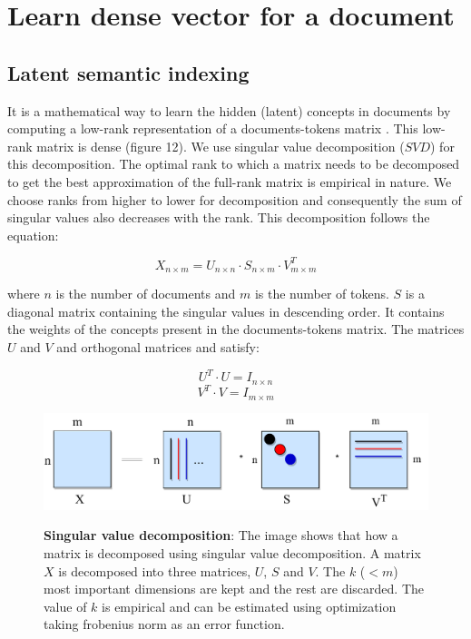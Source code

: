 \section{Learn dense vector for a document}
\subsection{Latent semantic indexing}
    It is a mathematical way to learn the hidden (latent) concepts in documents by computing a low-rank representation of a documents-tokens matrix \cite{Foltz1996, Shapiro2000, Landauer1998}. This low-rank matrix is dense (figure 12). We use singular value decomposition ($SVD$) for this decomposition. The optimal rank to which a matrix needs to be decomposed to get the best approximation of the full-rank matrix is empirical in nature. We choose ranks from higher to lower for decomposition and consequently the sum of singular values also decreases with the rank. This decomposition follows the equation:
    
    \begin{equation}
    X_{n \times m} = U_{n \times n} \cdot S_{n \times m} \cdot V_{m \times m}^T
    \end{equation}
    
    where $n$ is the number of documents and $m$ is the number of tokens. $S$ is a diagonal matrix containing the singular values in descending order. It contains the weights of the concepts present in the documents-tokens matrix. The matrices $U$ and $V$ and orthogonal matrices and satisfy:
    
    \begin{equation}
    U^T \cdot U = I_{n \times n}
    \end{equation}
    \begin{equation}
    V^T \cdot V = I_{m \times m}
    \end{equation}
    
\begin{figure}[h]
\begin{centering}
    {\includegraphics[scale=0.7]{figures/usv.pdf}}
    \caption[Pictorial representation of singular value decomposition]{\textbf{Singular value decomposition}: The image shows that how a matrix is decomposed using singular value decomposition. A matrix $X$ is decomposed into three matrices, $U$, $S$ and $V$. The $k$ ($<m$) most important dimensions are kept and the rest are discarded. The value of $k$ is empirical and can be estimated using optimization taking frobenius norm as an error function.}
\end{centering}
\end{figure}


